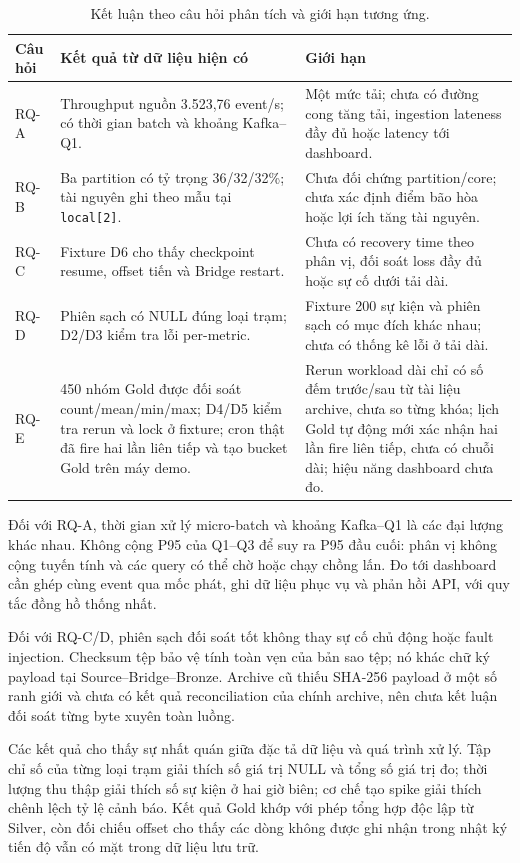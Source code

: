 \begin{table}[H]
\centering
\caption{Kết luận theo câu hỏi phân tích và giới hạn tương ứng.}
\label{tab:rq-evidence}
\small
\begin{tabularx}{\textwidth}{l X X}
\toprule
\textbf{Câu hỏi} & \textbf{Kết quả từ dữ liệu hiện có} & \textbf{Giới hạn} \\
\midrule
RQ-A & Throughput nguồn 3.523,76 event/s; có thời gian batch và khoảng Kafka--Q1. & Một mức tải; chưa có đường cong tăng tải, ingestion lateness đầy đủ hoặc latency tới dashboard. \\
RQ-B & Ba partition có tỷ trọng 36/32/32\%; tài nguyên ghi theo mẫu tại \texttt{local[2]}. & Chưa đối chứng partition/core; chưa xác định điểm bão hòa hoặc lợi ích tăng tài nguyên. \\
RQ-C & Fixture D6 cho thấy checkpoint resume, offset tiến và Bridge restart. & Chưa có recovery time theo phân vị, đối soát loss đầy đủ hoặc sự cố dưới tải dài. \\
RQ-D & Phiên sạch có NULL đúng loại trạm; D2/D3 kiểm tra lỗi per-metric. & Fixture 200 sự kiện và phiên sạch có mục đích khác nhau; chưa có thống kê lỗi ở tải dài. \\
RQ-E & 450 nhóm Gold được đối soát count/mean/min/max; D4/D5 kiểm tra rerun và lock ở fixture; cron thật đã fire hai lần liên tiếp và tạo bucket Gold trên máy demo. & Rerun workload dài chỉ có số đếm trước/sau từ tài liệu archive, chưa so từng khóa; lịch Gold tự động mới xác nhận hai lần fire liên tiếp, chưa có chuỗi dài; hiệu năng dashboard chưa đo. \\
\bottomrule
\end{tabularx}
\end{table}

Đối với RQ-A, thời gian xử lý micro-batch và khoảng Kafka--Q1 là các
đại lượng khác nhau. Không cộng P95 của Q1--Q3 để suy ra P95 đầu cuối:
phân vị không cộng tuyến tính và các query có thể chờ hoặc chạy chồng
lấn. Đo tới dashboard cần ghép cùng event qua mốc phát, ghi dữ liệu phục
vụ và phản hồi API, với quy tắc đồng hồ thống nhất.

Đối với RQ-C/D, phiên sạch đối soát tốt không thay sự cố chủ động hoặc
fault injection. Checksum tệp bảo vệ tính toàn vẹn của bản sao tệp;
nó khác chữ ký payload tại Source--Bridge--Bronze. Archive cũ thiếu
SHA-256 payload ở một số ranh giới và chưa có kết quả reconciliation của
chính archive, nên chưa kết luận đối soát từng byte xuyên toàn luồng.

Các kết quả cho thấy sự nhất quán giữa đặc tả dữ liệu và quá trình xử lý. Tập chỉ số của từng loại trạm giải thích số giá trị NULL và tổng số giá trị đo; thời lượng thu thập giải thích số sự kiện ở hai giờ biên; cơ chế tạo spike giải thích chênh lệch tỷ lệ cảnh báo. Kết quả Gold khớp với phép tổng hợp độc lập từ Silver, còn đối chiếu offset cho thấy các dòng không được ghi nhận trong nhật ký tiến độ vẫn có mặt trong dữ liệu lưu trữ.

